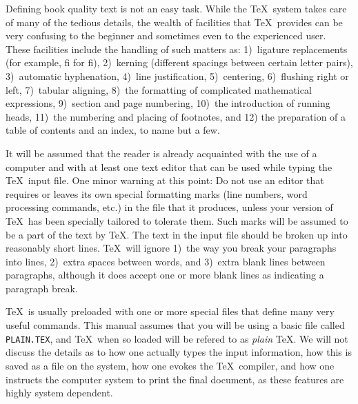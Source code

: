 Defining book quality text is not an easy task.  While the \TeX\ system
takes care of many of the tedious details, the wealth of facilities that
\TeX\ provides can be very confusing to the beginner and sometimes even to
the experienced user.  These facilities include the handling of such
matters as: 1)~ligature replacements (for example, fi for f{i}),
2)~kerning (different spacings between certain letter pairs), 3)~automatic
hyphenation, 4)~line justification, 5)~centering, 6)~flushing right or
left, 7)~tabular aligning, 8)~the formatting of complicated mathematical
expressions, 9)~section and page numbering, 10)~the introduction of
running heads, 11)~the numbering and placing of footnotes, and 12) the
preparation of a table of contents and an index, to name but a few.

It will be assumed that the reader is already acquainted with the use of a
computer and with at least one text editor that can be used while typing
the \TeX\ input file.  One minor warning at this point: Do not use an
editor that requires or leaves its own special formatting marks (line numbers,
word processing commands, etc.)
in the
file that it produces, unless your version of \TeX\ has been specially tailored to 
tolerate them. Such marks will be assumed to be a part of the text
by \TeX . The text in the input file should be broken up into
reasonably short lines.  \TeX\ will ignore 1)~the way you break your
paragraphs into lines, 2)~extra
spaces between words, and 3)~extra blank lines between paragraphs,
although it does accept one or more blank lines as indicating a paragraph break.

\TeX\ is usually preloaded with one or more special files that define many
very useful commands.  This manual assumes that you will be using a basic
file called {\tt PLAIN.TEX}, and \TeX\ when so loaded will be refered to
as {\sl plain} \TeX . We will not discuss the details as to how one
actually types the input information, how this is saved as a file on the
system, how one evokes the \TeX\ compiler, and how one instructs the
computer system to print the final document, as these features are highly
system dependent.

\eject
{}

